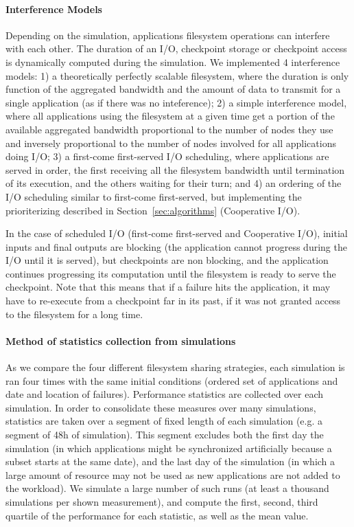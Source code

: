 \paragraph*{Interference Models}
Depending on the simulation, applications filesystem operations can
interfere with each other. The duration of an I/O, checkpoint storage
or checkpoint access is dynamically computed during the simulation. We
implemented 4 interference models: 1) a theoretically perfectly scalable
filesystem, where the duration is only function of the aggregated
bandwidth and the amount of data to transmit for a single application
(as if there was no inteference); 2) a simple interference model,
where all applications using the filesystem at a given time get a
portion of the available aggregated bandwidth proportional to the
number of nodes they use and inversely proportional to the number of
nodes involved for all applications doing I/O; 3) a first-come
first-served I/O scheduling, where applications are served in order,
the first receiving all the filesystem bandwidth until termination of
its execution, and the others waiting for their turn; and 4) an
ordering of the I/O scheduling similar to first-come first-served, but
implementing the prioriterizing described in
Section~\ref{sec:algorithms} (Cooperative I/O).

In the case of scheduled I/O (first-come first-served and Cooperative
I/O), initial inputs and final outputs are blocking (the application
cannot progress during the I/O until it is served), but checkpoints
are non blocking, and the application continues progressing its
computation until the filesystem is ready to serve the
checkpoint. Note that this means that if a failure hits the
application, it may have to re-execute from a checkpoint far in its
past, if it was not granted access to the filesystem for a long time.

\paragraph*{Method of statistics collection from simulations}
As we compare the four different filesystem sharing strategies, each
simulation is ran four times with the same initial conditions (ordered
set of applications and date and location of failures). Performance
statistics are collected over each simulation. In order to consolidate
these measures over many simulations, statistics are taken over a
segment of fixed length of each simulation (e.g. a segment of 48h of
simulation). This segment excludes both the first day the simulation
(in which applications might be synchronized artificially because a
subset starts at the same date), and the last day of the simulation
(in which a large amount of resource may not be used as new
applications are not added to the workload). We simulate a large
number of such runs (at least a thousand simulations per shown
measurement), and compute the first, second, third quartile of the
performance for each statistic, as well as the mean value.
